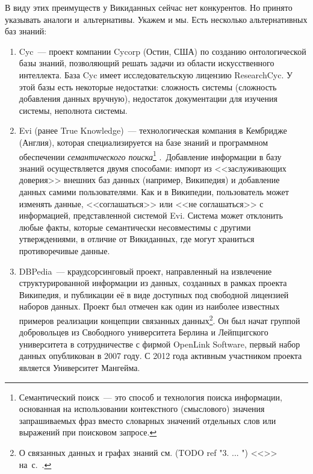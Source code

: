 В виду этих преимуществ у Викиданных сейчас нет конкурентов. 
Но принято указывать аналоги и~альтернативы. Укажем и мы. Есть несколько альтернативных баз знаний:
\begin{enumerate}
\item Cyc~--- проект компании Cycorp (Остин, США) по созданию онтологической базы знаний, позволяющий решать задачи из области искусственного интеллекта\autocite{Cyc}. База Cyc имеет исследовательскую лицензию ResearchCyc. У этой базы есть некоторые недостатки: сложность системы (сложность добавления данных
вручную), недостаток документации для изучения системы, неполнота системы.
\item Evi (ранее True Knowledge\autocite{True_Knowledge})~--- 
    технологическая компания в Кембридже (Англия), 
        которая специализируется на базе знаний и программном обеспечении 
        \textit{семантического поиска}\footnote[][1\baselineskip]{%
            Семантический поиск~--- 
            это способ и технология поиска информации, 
            основанная на использовании контекстного (смыслового) значения запрашиваемых фраз 
            вместо словарных значений отдельных слов или выражений при поисковом запросе.}%
.\,     Добавление информации в базу знаний осуществляется двумя способами: импорт из <<заслуживающих доверия>> внешних баз данных (например, Википедия) и добавление данных самими пользователями. Как и в Википедии, пользователь может изменять
данные, <<соглашаться>> или <<не соглашаться>> с информацией, представленной системой Evi. Система может отклонить любые факты, которые семантически несовместимы с другими утверждениями, в отличие от Викиданных, где могут
храниться противоречивые данные.
\item DBPedia~--- краудсорсинговый проект, 
    направленный на извлечение структурированной информации из данных, 
        созданных в рамках проекта Википедия, 
        и публикации её в виде доступных под свободной лицензией наборов данных. 
        Проект был отмечен как один из наиболее известных примеров реализации 
        концепции связанных данных\footnote[][]{%
%
О связанных данных и графах знаний см. (TODO ref "3. ... ") <<>> на~с.~\pageref{ch:BucketsAndBalls}.%
%
}.      Он был начат группой добровольцев из Свободного университета Берлина и Лейпцигского университета 
        в сотрудничестве с фирмой OpenLink Software, первый набор данных опубликован в 2007 году. 
        С 2012 года активным участником проекта является Университет Мангейма.%
\end{enumerate}


